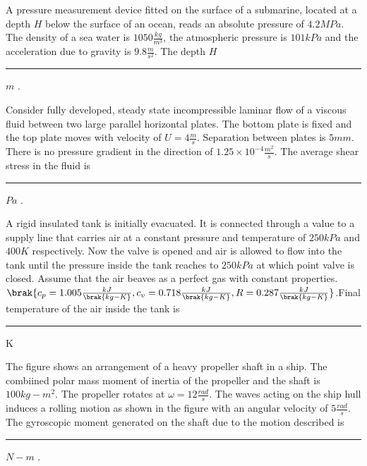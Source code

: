 		\hfill{}

	\item A pressure measurement device fitted on the surface of a submarine, located at a depth $H$ below the surface of an ocean, reads an absolute pressure of $4.2 MPa$. The density of a sea water is $1050\frac{kg}{m^3}$, the atmospheric pressure is $101 kPa$ and the acceleration due to gravity is $9.8\frac{m}{s^2}$. The depth $H$ \rule{1cm}{0.1pt} $m$ .

		\hfill{}

	\item Consider fully developed, steady state incompressible laminar flow of a viscous fluid between two large parallel horizontal plates. The bottom plate is fixed and the top plate moves with velocity of $U = 4 \frac{m}{s}$. Separation between plates is $5 mm$. There is no pressure gradient in the direction of $1.25 \times 10^{-4} \frac{m^2}{s}$. The average shear stress in the fluid is \rule{1cm}{0.1pt} $Pa$ .

		\hfill{}

	\item A rigid insulated tank is initially evacuated. It is connected through a value to a supply line that carries air at a constant pressure and temperature of $250 kPa$ and $400 K$ respectively. Now the valve is opened and air is allowed to flow into the tank until the pressure inside the tank reaches to $250 kPa$ at which point valve is closed. Assume that the air beaves as a perfect gas with constant properties. $\brak{c_p = 1.005 \frac{kJ}{\brak{kg-K}}, c_v = 0.718 \frac{kJ}{\brak{kg-K}}, R = 0.287 \frac{kJ}{\brak{kg-K}}}$.Final temperature of the air inside the tank is \rule{1cm}{0.1pt} K 

		\hfill{}

	\item The figure shows an arrangement of a heavy propeller shaft in a ship. The combiined polar mass moment of inertia of the propeller and the shaft is $100 kg-m^2$. The propeller rotates at $\omega = 12 \frac{rad}{s}$. The waves acting on the ship hull induces a rolling motion as shown in the figure with an angular velocity of $5 \frac{rad}{s}$. The gyroscopic moment generated on the shaft due to the motion described is \rule{1cm}{0.1pt} $N-m$ . 

